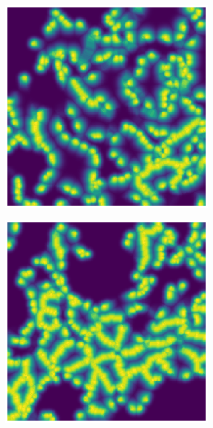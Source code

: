 \documentclass[10pt, journal, compsoc]{IEEEtran}
\begin{document}
\begin{figure}
\centering
\begin{subfigure}[b]{0.45\linewidth}
\includegraphics[width=\linewidth]{weights/110082-wmap.eps}
\end{subfigure}
\begin{subfigure}[b]{0.45\linewidth}
\includegraphics[width=\linewidth]{weights/110115-wmap.eps}

\end{subfigure}
\end{figure}
\end{document}
